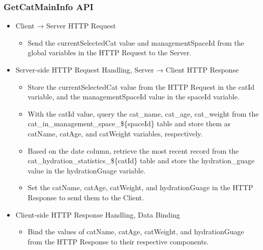 \documentclass[conference]{IEEEtran}
\begin{document}
\subsubsection{GetCatMainInfo API}
\begin{itemize}
    \item Client → Server HTTP Request
    \begin{itemize}
        \item Send the currentSelectedCat value and managementSpaceId from the global variables in the HTTP Request to the Server.
        \\
    \end{itemize}
    \item Server-side HTTP Request Handling, Server → Client HTTP Response
    \begin{itemize}
        \item Store the currentSelectedCat value from the HTTP Request in the catId variable, and the managementSpaceId value in the spaceId variable.
        \item With the catId value, query the cat\_name, cat\_age, cat\_weight from the cat\_in\_management\_space\_\$\{spaceId\} table and store them as catName, catAge, and catWeight variables, respectively.
        \item Based on the date column, retrieve the most recent record from the cat\_hydration\_statistics\_\$\{catId\} table and store the hydration\_guage value in the hydrationGuage variable.
        \item Set the catName, catAge, catWeight, and hydrationGuage in the HTTP Response to send them to the Client.
        \\
    \end{itemize}
    \item Client-side HTTP Response Handling, Data Binding
    \begin{itemize}
        \item Bind the values of catName, catAge, catWeight, and hydrationGuage from the HTTP Response to their respective components.
        \\
    \end{itemize}
\end{itemize}
\end{document}
